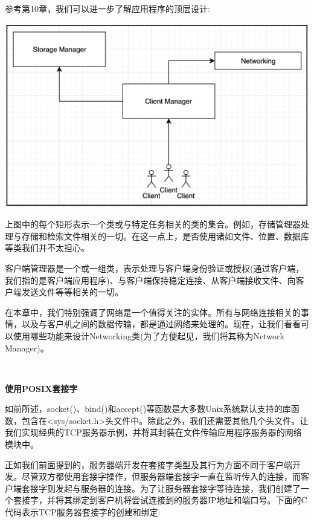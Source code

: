参考第10章，我们可以进一步了解应用程序的顶层设计: \par

\begin{center}
	\includegraphics[width=1.0\textwidth]{content/Section-2/Chapter-12/10}
\end{center}

上图中的每个矩形表示一个类或与特定任务相关的类的集合。例如，存储管理器处理与存储和检索文件相关的一切。在这一点上，是否使用诸如文件、位置、数据库等类我们并不太担心。 \par
客户端管理器是一个或一组类，表示处理与客户端身份验证或授权(通过客户端，我们指的是客户端应用程序)、与客户端保持稳定连接、从客户端接收文件、向客户端发送文件等等相关的一切。 \par
在本章中，我们特别强调了网络是一个值得关注的实体。所有与网络连接相关的事情，以及与客户机之间的数据传输，都是通过网络来处理的。现在，让我们看看可以使用哪些功能来设计Networking类(为了方便起见，我们将其称为Network Manager)。 \par

\noindent\textbf{}\ \par
\textbf{使用POSIX套接字} \ \par
如前所述，socket()、bind()和accept()等函数是大多数Unix系统默认支持的库函数，包含在<sys/socket.h>头文件中。除此之外，我们还需要其他几个头文件。让我们实现经典的TCP服务器示例，并将其封装在文件传输应用程序服务器的网络模块中。 \par
正如我们前面提到的，服务器端开发在套接字类型及其行为方面不同于客户端开发。尽管双方都使用套接字操作，但服务器端套接字一直在监听传入的连接，而客户端套接字则发起与服务器的连接。为了让服务器套接字等待连接，我们创建了一个套接字，并将其绑定到客户机将尝试连接到的服务器IP地址和端口号。下面的C代码表示TCP服务器套接字的创建和绑定: \par

